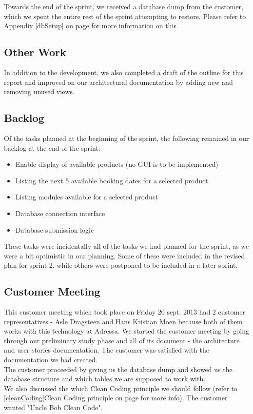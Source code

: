 Towards the end of the sprint, we received a database dump from the customer, which we spent the entire rest of the sprint attempting to restore. Please refer to Appendix \ref{dbSetup} on page \pageref{dbSetup} for more information on this.

\subsection{Other Work}
In addition to the development, we also completed a draft of the outline for this report and improved on our architectural documentation by adding new and removing unused views.

\subsection{Backlog}
Of the tasks planned at the beginning of the sprint, the following remained in our backlog at the end of the sprint:
\begin{itemize}
	\item Enable display of available products (no GUI is to be implemented)
	\item Listing the next 5 available booking dates for a selected product
	\item Listing modules available for a selected product
	\item Database connection interface
	\item Database submission logic
\end{itemize}

These tasks were incidentally all of the tasks we had planned for the sprint, as we were a bit optimistic in our planning. Some of these were included in the revised plan for sprint 2, while others were postponed to be included in a later sprint.

\subsection{Customer Meeting}
This customer meeting which took place on Friday 20 sept. 2013 had 2 customer representatives - Asle Dragsteen and Hans Kristian Moen because both of them works with this technology at Adressa. 
We started the customer meeting by going through our preliminary study phase and all of its document - the architecture and user stories documentation. The customer was satisfied with the documentation we had created.\\
The customer proceeded by giving us the database dump and showed us the database structure and which tables we are supposed to work with.\\
We also discussed the which Clean Coding principle we should follow (refer to \ref{cleanCoding}Clean Coding principle on page \pageref{cleanCoding} for more info). The customer wanted "Uncle Bob Clean Code".

